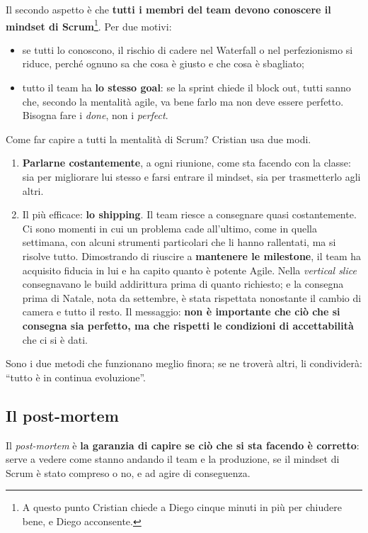 Il secondo aspetto è che \textbf{tutti i membri del team devono conoscere il
mindset di Scrum}\footnote{A questo punto Cristian chiede a Diego cinque minuti
in più per chiudere bene, e Diego acconsente.}. Per due motivi:
\begin{itemize}
  \item se tutti lo conoscono, il rischio di cadere nel Waterfall o nel
        perfezionismo si riduce, perché ognuno sa che cosa è giusto e che cosa
        è sbagliato;
  \item tutto il team ha \textbf{lo stesso goal}: se la sprint chiede il block
        out, tutti sanno che, secondo la mentalità agile, va bene farlo ma non
        deve essere perfetto. Bisogna fare i \emph{done}, non i
        \emph{perfect}.
\end{itemize}
Come far capire a tutti la mentalità di Scrum? Cristian usa due modi.
\begin{enumerate}
  \item \textbf{Parlarne costantemente}, a ogni riunione, come sta facendo con
        la classe: sia per migliorare lui stesso e farsi entrare il mindset,
        sia per trasmetterlo agli altri.
  \item Il più efficace: \textbf{lo shipping}. Il team riesce a consegnare
        quasi costantemente. Ci sono momenti in cui un problema cade
        all'ultimo, come in quella settimana, con alcuni strumenti
        particolari che li hanno rallentati, ma si risolve tutto. Dimostrando
        di riuscire a \textbf{mantenere le milestone}, il team ha acquisito
        fiducia in lui e ha capito quanto è potente Agile. Nella
        \emph{vertical slice} consegnavano le build addirittura prima di
        quanto richiesto; e la consegna prima di Natale, nota da settembre, è
        stata rispettata nonostante il cambio di camera e tutto il resto. Il
        messaggio: \textbf{non è importante che ciò che si consegna sia
        perfetto, ma che rispetti le condizioni di accettabilità} che ci si è
        dati.
\end{enumerate}
Sono i due metodi che funzionano meglio finora; se ne troverà altri, li
condividerà: ``tutto è in continua evoluzione''.

\subsection{Il post-mortem}

Il \emph{post-mortem} è \textbf{la garanzia di capire se ciò che si sta facendo
è corretto}: serve a vedere come stanno andando il team e la produzione, se il
mindset di Scrum è stato compreso o no, e ad agire di conseguenza.

